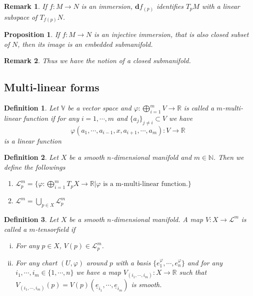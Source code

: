 \documentclass{article}
\newtheorem{proposition}{Proposition}[section]
\newtheorem{definition}{Definition}[section]
\newtheorem{remark}{Remark}[section]
\numberwithin{equation}{section}
\begin{document}
\begin{remark}
If $f:M\to N$ is an immersion, $\mathbf{d}f_(p)$ identifies $T_pM$ with a linear subspace of $T_{f(p)}N$. 
\end{remark}

\begin{proposition}
If $f:M\to N$ is an injective immersion, that is also closed subset of $N$, then its image is an embedded submanifold. 
\end{proposition}

\begin{remark}
Thus we have the notion of a closed submanifold. 
\end{remark}

\subsection{Multi-linear forms}
\begin{definition}
Let $\mathbb{V}$ be a vector space and $\varphi:\bigoplus_{i=1}^mV\to\mathbb{R}$ is called a $m$-multi-linear function if for any $i=1,\cdots,m$ and $\{a_j\}_{j\not=i}\subset V$ we have
\begin{equation*}
\varphi(a_1,\cdots,a_{i-1},x,a_{i+1},\cdots,a_m):V\to\mathbb{R}
\end{equation*}
is a linear function
\end{definition}

\begin{definition}
Let $X$ be a smooth $n$-dimensional manifold and $m\in\mathbb{N}$. Then we define the followings
\begin{enumerate}
\item $\mathcal{L}^m_p=\{\varphi:\bigoplus_{i=1}^mT_pX\to\mathbb{R}|\varphi \text{ is a m-multi-linear function.}\}$
\item $\mathcal{L}^m=\bigcup_{p\in X}\mathcal{L}^m_p$
\end{enumerate}
\end{definition}

\begin{definition}
Let $X$ be a smooth $n$-dimensional manifold. A map $V:X\to\mathcal{L}^m$ is called a $m$-tensorfield if 
\begin{enumerate}[i.]
\item For any $p\in X$, $V(p)\in\mathcal{L}^m_p$.
\item For any chart $(U,\varphi)$ around $p$ with a basis $\{e_1^\varphi,\cdots,e_n^\varphi\}$ and for any $i_1,\cdots,i_m\in\{1,\cdots,n\}$ we have a map $V_{(i_1,\cdots,i_m)}:X\to\mathbb{R}$ such that $V_{(i_1,\cdots,i_m)}(p)=V(p)(\underline{e}_{i_1},\cdots,\underline{e}_{i_m})$ is smooth.
\end{enumerate}
\end{definition}
\end{document}
